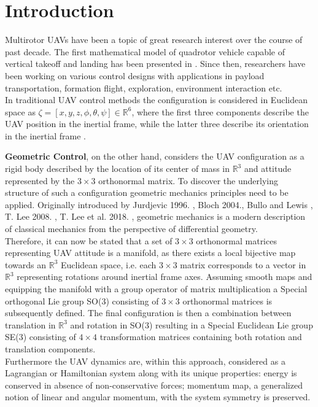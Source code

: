 \section{Introduction}

Multirotor UAVs have been a topic of great research interest over the course of past decade. The first mathematical model of quadrotor vehicle capable of vertical takeoff and landing has been presented in \cite{hamel2002quad}. Since then, researchers have been working on various control designs with applications in payload transportation, formation flight, exploration, environment interaction etc.\\
In traditional UAV control methods the configuration is considered in Euclidean space as $\zeta = [x, y, z, \phi, \theta, \psi] \in \mathbb{R}^6$, where the first three components describe the UAV position in the inertial frame, while the latter three describe its orientation in the inertial frame \cite{uavModel}.

\noindent \textbf{Geometric Control}, on the other hand, considers the UAV configuration as a rigid body described by the location of its center of mass in $\mathbb{R}^3$ and attitude represented by the $3\times3$ orthonormal matrix. To discover the underlying structure of such a configuration geometric mechanics principles need to be applied. Originally introduced by Jurdjevic 1996. \cite{jurdjevic_1996}, Bloch 2004.\cite{bloch}, Bullo and Lewis \cite{bulloBook}, T. Lee 2008. \cite{Lee2008ComputationalGM}, T. Lee et al. 2018. \cite{LeeModel}, geometric mechanics is a modern description of classical mechanics from the perspective of differential geometry. \\
Therefore, it can now be stated that a set of $3\times3$ orthonormal matrices representing UAV attitude is a manifold, as there exists a local bijective map towards an $\mathbb{R}^3$ Euclidean space, i.e. each $3\times3$ matrix corresponds to a vector in $\mathbb{R}^3$ representing rotations around inertial frame axes. Assuming smooth maps and equipping the manifold with a group operator of matrix multiplication a Special orthogonal Lie group SO(3) consisting of $3\times3$ orthonormal matrices is subsequently defined. The final configuration is then a combination between translation in $\mathbb{R}^3$ and rotation in SO(3) resulting in a Special Euclidean Lie group SE(3) consisting of $4\times4$ transformation matrices containing both rotation and translation components. \\ 
Furthermore the UAV dynamics are, within this approach, considered as a Lagrangian or Hamiltonian system along with its unique properties: energy is conserved in absence of non-conservative forces; momentum map, a generalized notion of linear and angular momentum, with the system symmetry is preserved.

